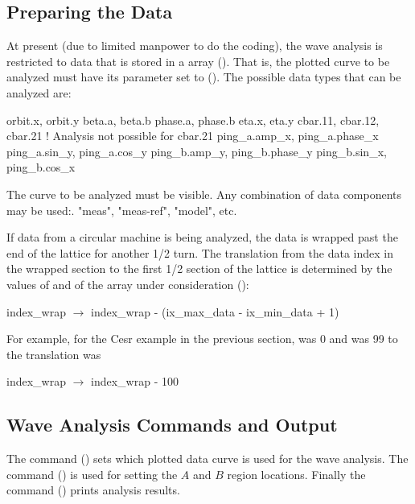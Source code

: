 \subsection{Preparing the Data} 
\label{ss:wave.data}

At present (due to limited manpower to do the coding), the wave analysis is restricted to data that
is stored in a  array (). That is, the plotted curve to be analyzed must
have its  parameter set to  (). The possible data types
that can be analyzed are:
\begin{example}
  orbit.x, orbit.y
  beta.a,  beta.b
  phase.a, phase.b
  eta.x, eta.y
  cbar.11, cbar.12, cbar.21      ! Analysis not possible for cbar.21
  ping_a.amp_x, ping_a.phase_x
  ping_a.sin_y, ping_a.cos_y
  ping_b.amp_y, ping_b.phase_y
  ping_b.sin_x, ping_b.cos_x
\end{example}
The curve to be analyzed must be visible. Any combination of data components may be used:. "meas",
"meas-ref", "model", etc.

If data from a circular machine is being analyzed, the data is wrapped past the end of the lattice
for another 1/2 turn. The translation from the data index in the wrapped section to the first 1/2
section of the lattice is determined by the values of  and  of the
 array under consideration ():
\begin{example}
  index_wrap \(\longrightarrow\) index_wrap - (ix_max_data - ix_min_data + 1)
\end{example}
For example, for the Cesr example in the previous section,  was 0 and
 was 99 to the translation was
\begin{example}
  index_wrap \(\longrightarrow\) index_wrap - 100
\end{example}

\subsection{Wave Analysis Commands and Output}
\label{ss:wave.cmd.out}

The  command () sets which plotted data curve is used for the wave
analysis. The  command () is used for setting the $A$ and $B$ region
locations. Finally the  command () prints analysis results.

